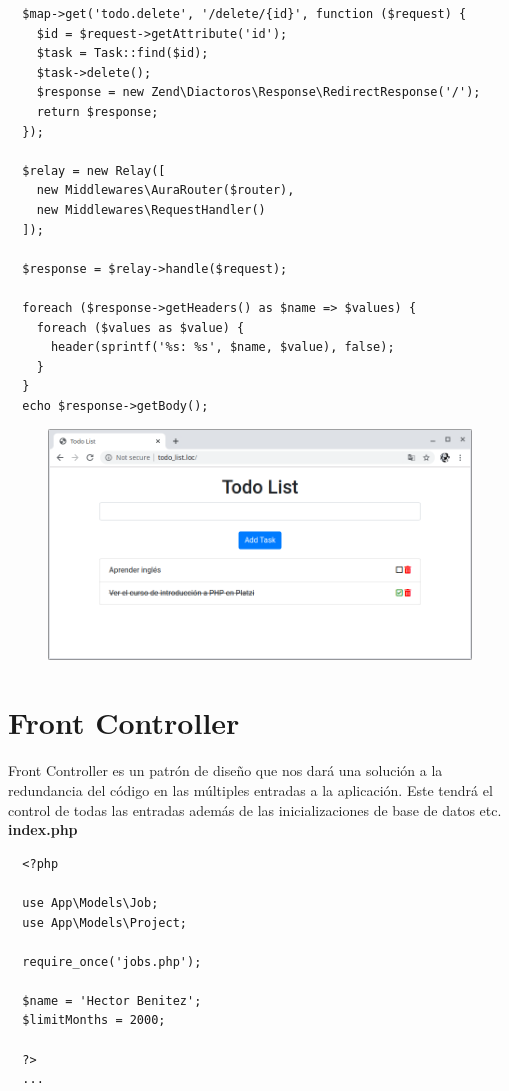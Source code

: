 \documentclass{article}
\begin{document}
\begin{verbatim}
  $map->get('todo.delete', '/delete/{id}', function ($request) {
    $id = $request->getAttribute('id');
    $task = Task::find($id);
    $task->delete();
    $response = new Zend\Diactoros\Response\RedirectResponse('/');
    return $response;
  });

  $relay = new Relay([
    new Middlewares\AuraRouter($router),
    new Middlewares\RequestHandler()
  ]);

  $response = $relay->handle($request);

  foreach ($response->getHeaders() as $name => $values) {
    foreach ($values as $value) {
      header(sprintf('%s: %s', $name, $value), false);
    }
  }
  echo $response->getBody();
\end{verbatim}

\newpage

\begin{figure}[h!]
  \centering
  \includegraphics[scale=0.5]{./Pictures/108_deleteFuncional.png}
\end{figure}

\newpage

\section{Front Controller}%
Front Controller es un patrón de diseño que nos dará una solución a la
redundancia del código en las múltiples entradas a la aplicación. Este tendrá
el control de todas las entradas además de las inicializaciones de base de
datos etc.\\

\textbf{index.php}
\begin{verbatim}
  <?php

  use App\Models\Job;
  use App\Models\Project;

  require_once('jobs.php');

  $name = 'Hector Benitez';
  $limitMonths = 2000;

  ?>
  ...
\end{verbatim}
\end{document}
